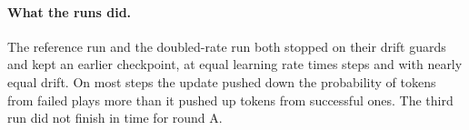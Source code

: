 \paragraph{What the runs did.}
The reference run and the doubled-rate run both stopped on their drift guards and kept an earlier checkpoint, at equal learning rate times steps and with nearly equal drift. %
On most steps the update pushed down the probability of tokens from failed plays more than it pushed up tokens from successful ones. %
The third run did not finish in time for round A. %

\notebox{\roundaresult} %
